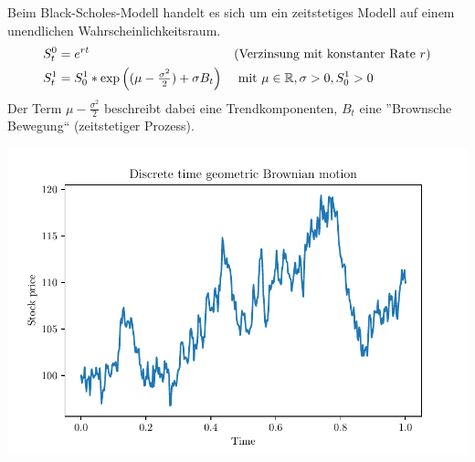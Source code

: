 \begin{beispiel}
	Beim Black-Scholes-Modell handelt es sich um ein zeitstetiges Modell auf einem unendlichen Wahrscheinlichkeitsraum.
	\begin{equation*}
		\begin{aligned}
		S_t^0 &= e^{rt} && (\text{Verzinsung mit konstanter Rate } r) \\
		S_t^1 &= S_0^1 * \exp\left( (\mu-\tfrac{\sigma^2}{2}) + \sigma B_t \right) &&\text{ mit } \mu \in \mathbb{R}, \sigma > 0, S_0^1 > 0
		\end{aligned}
	\end{equation*}
	Der Term $\mu-\frac{\sigma^2}{2}$ beschreibt dabei eine Trendkomponenten, $B_t$ eine ''Brownsche Bewegung`` (zeitstetiger Prozess).
	\begin{center}
		\includegraphics[width=.7\textwidth]{img/stockpricesim}
	\end{center}
\end{beispiel}

